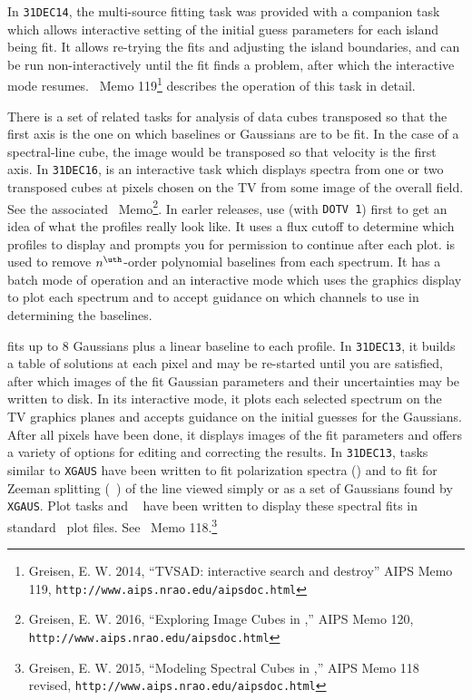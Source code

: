      In {\tt 31DEC14}, the multi-source fitting task {\tt {}}
was provided with a companion task {\tt {}} which allows
interactive setting of the initial guess parameters for each island
being fit.  It allows re-trying the fits and adjusting the island
boundaries, and can be run non-interactively until the fit finds a
problem, after which the interactive mode resumes.  \AIPS\ Memo
119\footnote{Greisen, E. W. 2014, ``TVSAD: interactive search and
destroy'' AIPS Memo 119, {\tt http://www.aips.nrao.edu/aipsdoc.html}}
describes the operation of this task in detail.

     There is a set of related tasks for analysis of data cubes
transposed so that the first axis is the one on which baselines or
Gaussians are to be fit.  In the case of a spectral-line cube, the
image would be transposed so that velocity is the first axis.
In {\tt 31DEC16}, {\tt {}} is an interactive task which
displays spectra from one or two transposed cubes at pixels chosen on
the TV from some image of the overall field.  See the associated
\AIPS\ Memo\footnote{Greisen, E. W. 2016, ``Exploring Image Cubes in
\AIPS,'' AIPS Memo 120,  {\tt http://www.aips.nrao.edu/aipsdoc.html}}.
In earler releases, use {\tt {}} (with {\tt DOTV 1}) first
to get an idea of what the profiles really look like.  It uses a flux
cutoff to determine which profiles to display and prompts you for
permission to continue after each plot.  {\tt {}} is used
to remove $n^{\uth}$-order polynomial baselines from each spectrum.
It has a batch mode of operation and an interactive mode which uses
the graphics display to plot each spectrum and to accept guidance on
which channels to use in determining the baselines.

{\tt {}} fits up to 8 Gaussians plus a linear baseline to
each profile.  In {\tt 31DEC13}, it builds a table of solutions at
each pixel and may be re-started until you are satisfied, after which
images of the fit Gaussian parameters and their uncertainties may be
written to disk.  In its interactive mode, it plots each selected
spectrum on the TV graphics planes and accepts guidance on the initial
guesses for the Gaussians.  After all pixels have been done, it
displays images of the fit parameters and offers a variety of options
for editing and correcting the results.  In {\tt 31DEC13}, tasks
similar to {\tt XGAUS} have been written to fit polarization spectra
({\tt {}}) and to fit for Zeeman splitting ({\tt
{}}) of the line viewed simply or as a set of Gaussians
found by {\tt XGAUS}\@.  Plot tasks {\tt {}} and {\tt
{}} have been written to display these spectral fits in
standard \AIPS\ plot files.  See \AIPS\ Memo 118.\footnote{Greisen, E.
W. 2015, ``Modeling Spectral Cubes in \AIPS,'' AIPS Memo 118 revised,
{\tt http://www.aips.nrao.edu/aipsdoc.html}}

